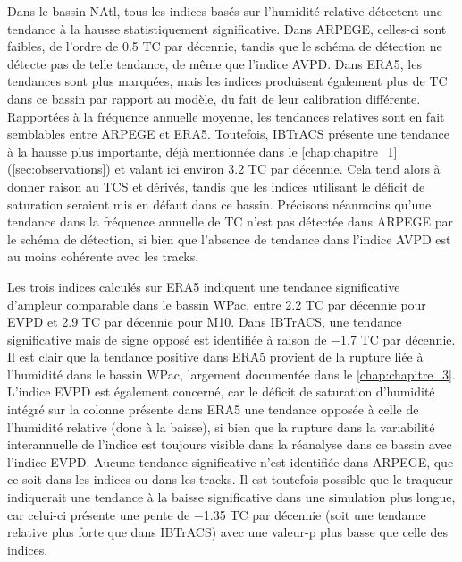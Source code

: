 \documentclass[../main.tex]{subfiles}
\begin{document}
Dans le bassin NAtl, tous les indices basés sur l'humidité relative détectent une tendance à la hausse statistiquement significative. Dans ARPEGE, celles-ci
sont faibles, de l'ordre de \num{0.5} TC par décennie, tandis que le schéma de détection ne détecte pas de telle tendance, de même que l'indice AVPD. Dans ERA5,
les tendances sont plus marquées, mais les indices produisent également plus de TC dans ce bassin par rapport au modèle, du fait de leur calibration différente.
Rapportées à la fréquence annuelle moyenne, les tendances relatives sont en fait semblables entre ARPEGE et ERA5. Toutefois, IBTrACS présente une tendance à la
hausse plus importante, déjà mentionnée dans le \cref{chap:chapitre_1} (\cref{sec:observations}) et valant ici environ \num{3.2} TC par décennie. Cela tend
alors à donner raison au TCS et dérivés, tandis que les indices utilisant le déficit de saturation seraient mis en défaut dans ce bassin. Précisons néanmoins
qu'une tendance dans la fréquence annuelle de TC n'est pas détectée dans ARPEGE par le schéma de détection, si bien que l'absence de tendance dans l'indice AVPD
est au moins cohérente avec les tracks.

Les trois indices calculés sur ERA5 indiquent une tendance significative d'ampleur comparable dans le bassin WPac, entre \num{2.2} TC par décennie pour EVPD et
\num{2.9} TC par décennie pour M10. Dans IBTrACS, une tendance significative mais de signe opposé est identifiée à raison de \num{-1.7} TC par décennie. Il est
clair que la tendance positive dans ERA5 provient de la rupture liée à l'humidité dans le bassin WPac, largement documentée dans le \cref{chap:chapitre_3}.
L'indice EVPD est également concerné, car le déficit de saturation d'humidité intégré sur la colonne présente dans ERA5 une tendance opposée à celle de
l'humidité relative (donc à la baisse), si bien que la rupture dans la variabilité interannuelle de l'indice est toujours visible dans la réanalyse dans ce
bassin avec l'indice EVPD. Aucune tendance significative n'est identifiée dans ARPEGE, que ce soit dans les indices ou dans les tracks. Il est toutefois
possible que le traqueur indiquerait une tendance à la baisse significative dans une simulation plus longue, car celui-ci présente une pente de \num{-1.35} TC
par décennie (soit une tendance relative plus forte que dans IBTrACS) avec une valeur-p plus basse que celle des indices.
\end{document}
